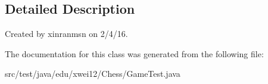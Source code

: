 \subsection{Detailed Description}
Created by xinranmsn on 2/4/16. 

The documentation for this class was generated from the following file\+:\begin{DoxyCompactItemize}
\item 
src/test/java/edu/xwei12/\+Chess/Game\+Test.\+java\end{DoxyCompactItemize}
